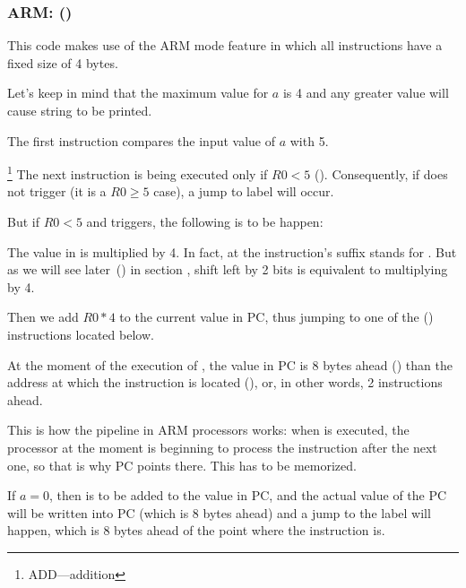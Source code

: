\subsubsection{ARM: \OptimizingKeilVI (\ARMMode)}
\label{sec:SwitchARMLot}



This code makes use of the ARM mode feature in which all instructions have a fixed size of 4 bytes.

Let's keep in mind that the maximum value for $a$ is 4 and any greater value will cause
 string to be printed.

The first  instruction compares the input value of $a$ with 5.

\footnote{ADD---addition}
The next  instruction is being executed only if $R0 < 5$ (). 
Consequently, if  does not trigger (it is a $R0 \geq 5$ case), a jump to  label will occur.

But if $R0 < 5$ and  triggers, the following is to be happen:

The value in  is multiplied by 4.
In fact,  at the instruction's suffix stands for .
But as we will see later~() in section \q{\ShiftsSectionName}, 
shift left by 2 bits is equivalent to multiplying by 4.

Then we add $R0*4$ to the current value in \ac{PC}, 
thus jumping to one of the  () instructions located below.

At the moment of the execution of , the value in \ac{PC} is 8 bytes ahead ()
than the address at which the  instruction is located (), 
or, in other words, 2 instructions ahead.


This is how the pipeline in ARM processors works: when  is executed,
the processor at the moment
is beginning to process the instruction after the next one,
so that is why \ac{PC} points there. This has to be memorized.

If $a=0$, then is to be added to the value in \ac{PC},
and the actual value of the \ac{PC} will be written into \ac{PC} (which is 8 bytes ahead)
and a jump to the label  will happen,
which is 8 bytes ahead of the point where the  instruction is.

